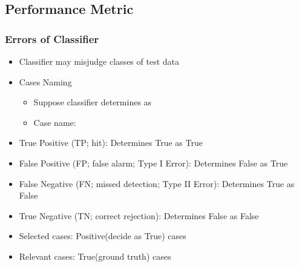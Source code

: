 \subsection{Performance Metric}

\subsubsection*{Errors of Classifier}
\begin{itemize}
    \item Classifier may misjudge classes of test data
    \item Cases Naming
    \begin{itemize}
        \item Suppose classifier determines  as 
        \item Case name: \textbf{}
    \end{itemize}
    \item True Positive (TP; hit): Determines True as True
    \item False Positive (FP; false alarm; Type I Error): Determines False as True
    \item False Negative (FN; missed detection; Type II Error): Determines True as False
    \item True Negative (TN; correct rejection): Determines False as False
    \item Selected cases: Positive(decide as True) cases
    \item Relevant cases: True(ground truth) cases
\end{itemize}
\begin{figures}
\end{figures}


